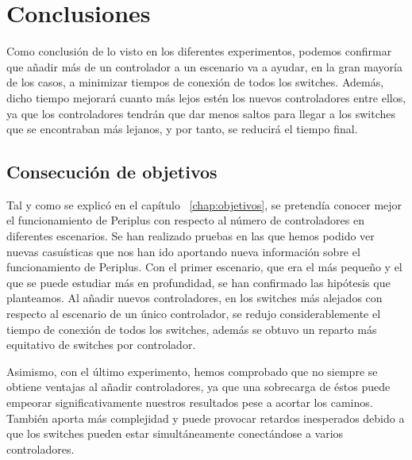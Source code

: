 \documentclass[a4paper, 12pt]{book}
\begin{document}
	
	
	\clearpage
	\chapter{Conclusiones}
	\label{chap:conclusiones}
	
	Como conclusión de lo visto en los diferentes experimentos, podemos confirmar que añadir más de un controlador a un escenario va a ayudar, en la gran mayoría de los casos, a minimizar tiempos de conexión de todos los switches. Además, dicho tiempo mejorará cuanto más lejos estén los nuevos controladores entre ellos, ya que los controladores tendrán que dar menos saltos para llegar a los switches que se encontraban más lejanos, y por tanto, se reducirá el tiempo final.  
	
	\section{Consecución de objetivos}
	\label{sec:consecucion-objetivos}
	
	Tal y como se explicó en el capítulo ~\ref{chap:objetivos}, se pretendía conocer mejor el funcionamiento de Periplus con respecto al número de controladores en diferentes escenarios. Se han realizado pruebas en las que hemos podido ver nuevas casuísticas que nos han ido aportando nueva información sobre el funcionamiento de Periplus. Con el primer escenario, que era el más pequeño y el que se puede estudiar más en profundidad, se han confirmado las hipótesis que planteamos. Al añadir nuevos controladores, en los switches más alejados con respecto al escenario de un único controlador, se redujo considerablemente el tiempo de conexión de todos los switches, además se obtuvo un reparto más equitativo de switches por controlador.
	
	Asimismo, con el último experimento, hemos comprobado que no siempre se obtiene ventajas al añadir controladores, ya que una sobrecarga de éstos puede empeorar significativamente nuestros resultados pese a acortar los caminos. También aporta más complejidad y puede provocar retardos inesperados debido a que los switches pueden estar simultáneamente conectándose a varios controladores.
	
\end{document}
